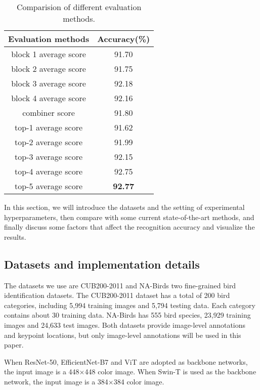 \documentclass[conference]{IEEEtran}
\begin{document}
\begin{table}[!tp]
\caption{Comparision of different evaluation methods.}
\begin{center}
\begin{tabular}{|c|c|}
\hline
Evaluation methods & Accuracy(\%) \\
\hline
block 1 average score & 91.70 \\
\hline
block 2 average score & 91.75 \\
\hline
block 3 average score & 92.18 \\
\hline
block 4 average score & 92.16 \\
\hline
combiner score & 91.80 \\
\hline
top-1 average score  & 91.62 \\
\hline
top-2 average score  & 91.99 \\
\hline
top-3 average score  & 92.15 \\
\hline
top-4 average score & 92.75 \\
\hline
top-5 average score  & \textbf{92.77} \\
\hline
\end{tabular}
\label{tab4}
\end{center}
\end{table}


In this section, we will introduce the datasets and the setting of experimental hyperparameters, then compare with some current state-of-the-art methods, and finally discuss some factors that affect the recognition accuracy and visualize the results.

\subsection{Datasets and implementation details}

The datasets we use are CUB200-2011\cite{CUB_200_2011} and NA-Birds\cite{NABirds} two fine-grained bird identification datasets. The CUB200-2011 dataset has a total of 200 bird categories, including 5,994 training images and 5,794 testing data. Each category contains about 30 training data. NA-Birds has 555 bird species, 23,929 training images and 24,633 test images. Both datasets provide image-level annotations and keypoint locations, but only  image-level annotations  will be used in this paper.

When ResNet-50\cite{ResNet}, EfficientNet-B7\cite{EfficientNet} and ViT\cite{ViT} are adopted as backbone networks, the input image is a 448×448 color image. When  Swin-T\cite{Swin_T} is used as the backbone network, the input image is a 384×384 color image. 
\end{document}
